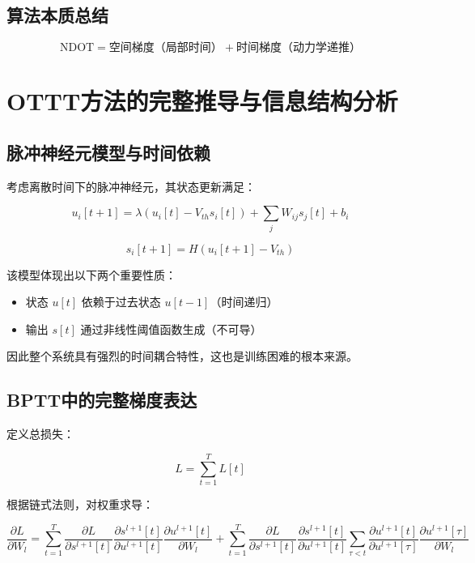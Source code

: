 \documentclass[journal,12pt,onecolumn]{IEEEtran}
\begin{document}
\subsection{算法本质总结}

\begin{equation}
\text{NDOT} =
\text{空间梯度（局部时间）}
+
\text{时间梯度（动力学递推）}
\end{equation}


\section{OTTT方法的完整推导与信息结构分析}

\subsection{脉冲神经元模型与时间依赖}

考虑离散时间下的脉冲神经元，其状态更新满足：

\begin{equation}
u_i[t+1] = \lambda (u_i[t] - V_{th} s_i[t]) + \sum_j W_{ij}s_j[t] + b_i
\end{equation}

\begin{equation}
s_i[t+1] = H(u_i[t+1] - V_{th})
\end{equation}

该模型体现出以下两个重要性质：

\begin{itemize}
\item 状态 $u[t]$ 依赖于过去状态 $u[t-1]$（时间递归）
\item 输出 $s[t]$ 通过非线性阈值函数生成（不可导）
\end{itemize}

因此整个系统具有强烈的时间耦合特性，这也是训练困难的根本来源。



\subsection{BPTT中的完整梯度表达}

定义总损失：

\begin{equation}
L = \sum_{t=1}^{T} L[t]
\end{equation}

根据链式法则，对权重求导：

\begin{equation}
\frac{\partial L}{\partial W_l}
=
\sum_{t=1}^{T}
\frac{\partial L}{\partial s^{l+1}[t]}
\frac{\partial s^{l+1}[t]}{\partial u^{l+1}[t]}
\frac{\partial u^{l+1}[t]}{\partial W_l}
+
\sum_{t=1}^{T}
\frac{\partial L}{\partial s^{l+1}[t]}
\frac{\partial s^{l+1}[t]}{\partial u^{l+1}[t]}
\sum_{\tau < t}
\frac{\partial u^{l+1}[t]}{\partial u^{l+1}[\tau]}
\frac{\partial u^{l+1}[\tau]}{\partial W_l}
\end{equation}
\end{document}
